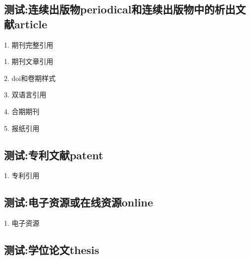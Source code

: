 \documentclass[11pt]{article} %
\begin{document}
\subsection{测试:连续出版物periodical和连续出版物中的析出文献article}

\begin{refsection}
1. 期刊完整引用\cite{periodical2}\cite{中华医学会湖北分会1984--}

\printbibliography[heading=bibliography,title=【连续出版物】]
\end{refsection}

\begin{refsection}
1. 期刊文章引用\cite{Chiani2003-840-845}

2. doi和卷期样式\cite{储大同2010-721-724}

3. 双语言引用\cite{bilangchenzhang}

4. 合期期刊\cite{储大同2010-721-724m}

5. 报纸引用\cite{傅刚2000--}

\printbibliography[heading=bibliography,title=【连续出版物中的析出文献】]
\end{refsection}

\subsection{测试:专利文献patent}

\begin{refsection}
1. 专利引用\cite{patent3}\cite{patent2}

\printbibliography[heading=bibliography,title=【专利】]
\end{refsection}

\subsection{测试:电子资源或在线资源online}

\begin{refsection}
1. 电子资源\cite{Alliance--,online1,online2,online3}\cite{OMG2003--}

\printbibliography[heading=bibliography,title=【电子资源】]
\end{refsection}


\subsection{测试:学位论文thesis}
\end{document}
